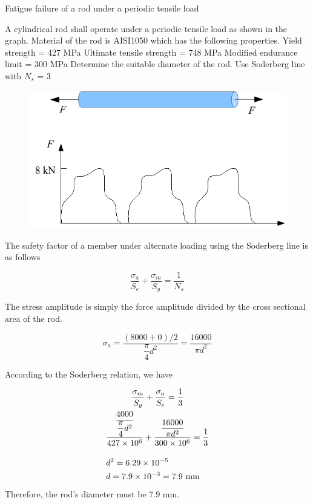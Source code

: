 \documentclass[
10pt,
a4paper,
openany,
svgnames,
]{book} %
\begin{document}
\begin{example} Fatigue failure of a rod under a periodic tensile load

  A cylindrical rod shall operate under a periodic tensile load as shown in the graph. Material of the rod is AISI1050 which has the following properties.
  Yield strength = 427 MPa
  Ultimate tensile strength = 748 MPa
  Modified endurance limit = 300 MPa
  Determine the suitable diameter of the rod. Use Soderberg line with $N_s$ = 3

  \begin{figure}[H]
    \centering
    \includegraphics[scale=0.9]{pictures/Failure-theories/fatigue-example}
  \end{figure}
\end{example}
\begin{solution}
    The safety factor of a member under alternate loading using the Soderberg line is as follows

    \[\frac{\sigma_a}{S_e} + \frac{\sigma_m}{S_y} = \frac{1}{N_s}\]

  The stress amplitude is simply the force amplitude divided by the cross sectional area of the rod.

  \[\sigma_a = \frac{(8000 + 0)/2}{\dfrac{\pi }{4}d^2} = \frac{16000}{\pi d^2}\]

  According to the Soderberg relation, we have

  \begin{gather*}
    \frac{\sigma_m}{S_y} + \frac{\sigma _a}{S_e} = \frac{1}{3} \\ 
    \dfrac{\dfrac{4000}{\dfrac{\pi }{4}d^2}}{427 \times 10^6} + \dfrac{\dfrac{16000}{\pi d^2}}{300 \times 10^6} = \frac{1}{3} \\[1em] 
    d^2 = 6.29 \times 10^{-5} \hfill \\
    d = 7.9 \times 10^{-3} = 7.9 \text{ mm} \hfill \\ 
  \end{gather*}
  Therefore, the rod’s diameter must be 7.9 mm.
\end{solution}
\end{document}

